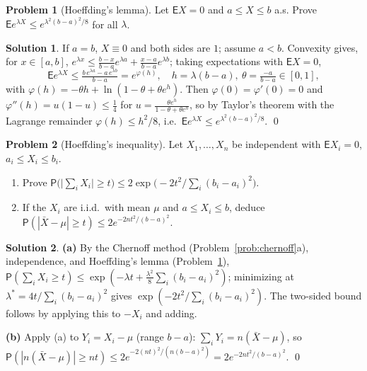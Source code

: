 \documentclass[12pt,a4paper]{article}
\theoremstyle{definition}
\newtheorem{exercise}{Problem}
\newtheorem*{solution*}{Solution}
\newcommand\expc{\mathsf{E}}
\newcommand\prb{\mathsf{P}}
\begin{document}
\begin{exercise}[Hoeffding's lemma]\label{prob:hlem}
Let $\expc X=0$ and $a\le X\le b$ a.s. Prove $\expc e^{\lambda X}\le e^{\lambda^2(b-a)^2/8}$ for all $\lambda$.
\end{exercise}
\begin{solution*}
If $a=b$, $X\equiv0$ and both sides are $1$; assume $a<b$. Convexity gives, for $x\in[a,b]$, $e^{\lambda x}\le\tfrac{b-x}{b-a}e^{\lambda a}+\tfrac{x-a}{b-a}e^{\lambda b}$; taking expectations with $\expc X=0$,
\[
\expc e^{\lambda X}\le\tfrac{b\,e^{\lambda a}-a\,e^{\lambda b}}{b-a}=e^{\varphi(h)},\quad h=\lambda(b-a),\ \theta=\tfrac{-a}{b-a}\in[0,1],
\]
with $\varphi(h)=-\theta h+\ln(1-\theta+\theta e^h)$. Then $\varphi(0)=\varphi'(0)=0$ and $\varphi''(h)=u(1-u)\le\tfrac14$ for $u=\tfrac{\theta e^h}{1-\theta+\theta e^h}$, so by Taylor's theorem with the Lagrange remainder $\varphi(h)\le h^2/8$, i.e.\ $\expc e^{\lambda X}\le e^{\lambda^2(b-a)^2/8}$. \qed
\end{solution*}

\begin{exercise}[Hoeffding's inequality]\label{prob:hoeff}
Let $X_1,\ldots,X_n$ be independent with $\expc X_i=0$, $a_i\le X_i\le b_i$.
\begin{enumerate}[label=(\alph*)]
\item Prove $\prb\bigl(\bigl|\sum_iX_i\bigr|\ge t\bigr)\le2\exp\bigl(-2t^2/\sum_i(b_i-a_i)^2\bigr)$.
\item If the $X_i$ are i.i.d.\ with mean $\mu$ and $a\le X_i\le b$, deduce $\prb(|\bar X-\mu|\ge t)\le2e^{-2nt^2/(b-a)^2}$.
\end{enumerate}
\end{exercise}
\begin{solution*}
\textbf{(a)} By the Chernoff method (Problem~\ref{prob:chernoff}a), independence, and Hoeffding's lemma (Problem~\ref{prob:hlem}), $\prb(\sum_iX_i\ge t)\le\exp(-\lambda t+\tfrac{\lambda^2}8\sum_i(b_i-a_i)^2)$; minimizing at $\lambda^*=4t/\sum_i(b_i-a_i)^2$ gives $\exp(-2t^2/\sum_i(b_i-a_i)^2)$. The two-sided bound follows by applying this to $-X_i$ and adding.

\textbf{(b)} Apply (a) to $Y_i=X_i-\mu$ (range $b-a$): $\sum_iY_i=n(\bar X-\mu)$, so $\prb(|n(\bar X-\mu)|\ge nt)\le2e^{-2(nt)^2/(n(b-a)^2)}=2e^{-2nt^2/(b-a)^2}$. \qed
\end{solution*}
\end{document}
